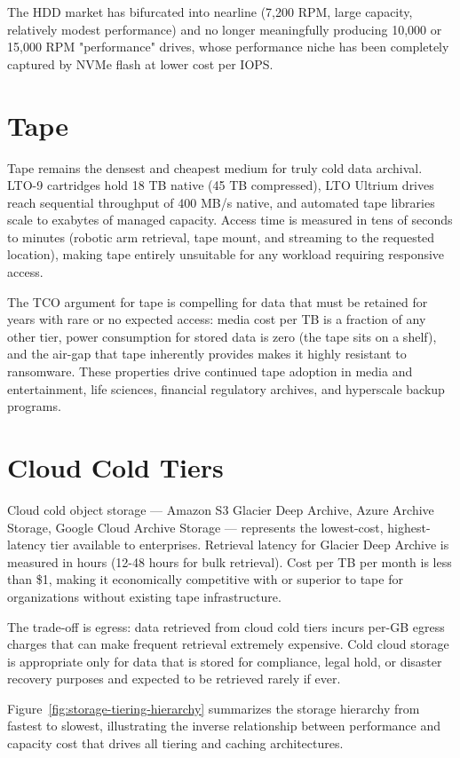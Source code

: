 The HDD market has bifurcated into nearline (7,200 RPM, large capacity, relatively modest performance) and no longer meaningfully producing 10,000 or 15,000 RPM "performance" drives, whose performance niche has been completely captured by NVMe flash at lower cost per IOPS.

\section{Tape}
Tape remains the densest and cheapest medium for truly cold data archival. LTO-9 cartridges hold 18 TB native (45 TB compressed), LTO Ultrium drives reach sequential throughput of 400 MB/s native, and automated tape libraries scale to exabytes of managed capacity. Access time is measured in tens of seconds to minutes (robotic arm retrieval, tape mount, and streaming to the requested location), making tape entirely unsuitable for any workload requiring responsive access.

The TCO argument for tape is compelling for data that must be retained for years with rare or no expected access: media cost per TB is a fraction of any other tier, power consumption for stored data is zero (the tape sits on a shelf), and the air-gap that tape inherently provides makes it highly resistant to ransomware. These properties drive continued tape adoption in media and entertainment, life sciences, financial regulatory archives, and hyperscale backup programs.

\section{Cloud Cold Tiers}
Cloud cold object storage --- Amazon S3 Glacier Deep Archive, Azure Archive Storage, Google Cloud Archive Storage --- represents the lowest-cost, highest-latency tier available to enterprises. Retrieval latency for Glacier Deep Archive is measured in hours (12-48 hours for bulk retrieval). Cost per TB per month is less than \$1, making it economically competitive with or superior to tape for organizations without existing tape infrastructure.

The trade-off is egress: data retrieved from cloud cold tiers incurs per-GB egress charges that can make frequent retrieval extremely expensive. Cold cloud storage is appropriate only for data that is stored for compliance, legal hold, or disaster recovery purposes and expected to be retrieved rarely if ever.

Figure~\ref{fig:storage-tiering-hierarchy} summarizes the storage hierarchy from fastest to slowest, illustrating the inverse relationship between performance and capacity cost that drives all tiering and caching architectures.

